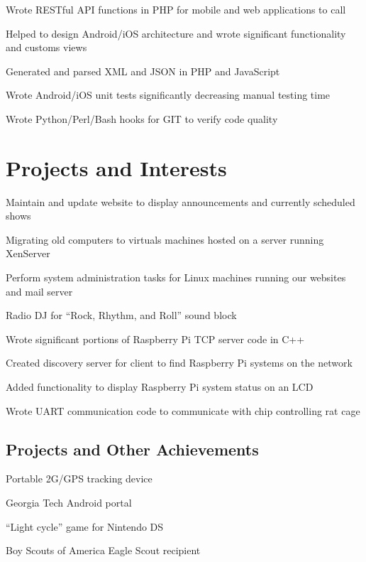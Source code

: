 \documentclass[line]{resume}
\begin{document}
\begin{myitemize}
	\item Wrote RESTful API functions in PHP for mobile and web applications to call 
	\item Helped to design Android/iOS architecture and wrote significant functionality and customs views
	\item Generated and parsed XML and JSON in PHP and JavaScript 
	\item Wrote Android/iOS unit tests significantly decreasing manual testing time 
	\item Wrote Python/Perl/Bash hooks for GIT to verify code quality
\end{myitemize}

\section{Projects and Interests}
\begin{myitemize}
	\item Maintain and update website to display announcements and currently scheduled shows 
	\item Migrating old computers to virtuals machines hosted on a server running XenServer 
	\item Perform system administration tasks for Linux machines running our websites and mail server 
	\item Radio DJ for ``Rock, Rhythm, and Roll'' sound block
\end{myitemize}

\begin{myitemize}
	\item Wrote significant portions of Raspberry Pi TCP server code in C++ 
	\item Created discovery server for client to find Raspberry Pi systems on the network 
	\item Added functionality to display Raspberry Pi system status on an LCD 
	\item Wrote UART communication code to communicate with chip controlling rat cage 
\end{myitemize}

 \subsection{Projects and Other Achievements}
\begin{compactitem}
\item Portable 2G/GPS tracking device 
\item Georgia Tech Android portal 
\item ``Light cycle'' game for Nintendo DS
\item Boy Scouts of America Eagle Scout recipient
\end{compactitem}
\end{document}
